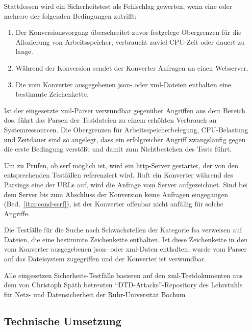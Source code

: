 \begin{samepage}
Stattdessen wird ein Sicherheitstest als Fehlschlag gewerten, wenn eine oder mehrere der folgenden Bedingungen zutrifft:
\begin{enumerate}
    \item{} Der Konversionsvorgang überschreitet zuvor festgelege Obergrenzen für die Allozierung von Arbeitsspeicher, verbraucht zuviel CPU-Zeit oder dauert zu lange.\label{itm:cond-dos}
    \item{} Während der Konversion sendet der Konverter Anfragen an einen Webserver.\label{itm:cond-ssrf}
    \item{} Die vom Konverter ausgegebenen \acrshort{json}- oder \acrshort{xml}-Dateien enthalten eine bestimmte Zeichenkette.\label{itm:cond-fsa}
\end{enumerate}
\end{samepage}

Ist der eingesetzte \acrshort{xml}-Parser verwundbar gegenüber Angriffen aus dem Bereich \acrfull{dos}, führt das Parsen der Testdateien zu einem erhöhten Verbrauch an Systemressourcen. Die Obergrenzen für Arbeitsspeicherbelegung, CPU-Belastung und Zeitdauer sind so angelegt, dass ein erfolgreicher Angriff zwangsläufig gegen die erste Bedingung verstößt und damit zum Nichtbestehen des Tests führt.

Um zu Prüfen, ob \acrfull{ssrf} möglich ist, wird ein \acrshort{http}-Server gestartet, der von den entsprechenden Testfällen referenziert wird. Ruft ein Konverter während des Parsings eine der URLs auf, wird die Anfrage vom Server aufgezeichnet. Sind bei dem Server bis zum Abschluss der Konversion keine Anfragen eingegangen (Bed.~\ref{itm:cond-ssrf}), ist der Konverter offenbar nicht anfällig für solche Angriffe.

Die Testfälle für die Suche nach Schwachstellen der Kategorie \acrlong{fsa} verweisen auf Dateien, die eine bestimmte Zeichenkette enthalten. Ist diese Zeichenkette in den vom Konverter ausgegebenen \acrshort{json}- oder \acrshort{xml}-Daten enthalten, wurde vom Parser auf das Dateisystem zugegriffen und der Konverter ist verwundbar.

Alle eingesetzen Sicherheits-Testfälle basieren auf den \acrshort{xml}-Testdokumenten aus dem von Christoph Späth betreuten \enquote{DTD-Attacks}-Repository des Lehrstuhls für Netz- und Datensicherheit der Ruhr-Universität Bochum~\cite{dtdattacksrepo}.

\subsection{Technische Umsetzung}

